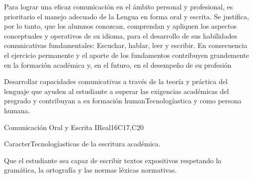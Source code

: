 \begin{syllabus}


\begin{justification}
Para lograr una eficaz comunicación en el ámbito personal y profesional, es prioritario el manejo adecuado de la Lengua en forma oral y escrita. Se justifica, por lo tanto, que los alumnos  conozcan, comprendan y apliquen los aspectos conceptuales y operativos de su idioma, para el desarrollo de sus habilidades comunicativas fundamentales: Escuchar, hablar, leer y escribir.
En consecuencia el ejercicio permanente y el aporte de los fundamentos contribuyen grandemente en la formación académica y, en el futuro, en el desempeño de su profesión
\end{justification}

\begin{goals}
\item Desarrollar capacidades comunicativas a través de la teoría y práctica del lenguaje que ayuden al estudiante a superar las exigencias académicas del pregrado y contribuyan a su formación humanTecnologíastica y como persona humana.
\end{goals}

\begin{outcomes}
   \item {}
   \item {}
   \item {}
\end{outcomes}

\begin{competences}
    \item {}
    \item {}
    \item {}
\end{competences}

\begin{unit}{Comunicación Oral y Escrita I}{}{Real}{16}{C17,C20}
  \begin{topics}
      \item CaracterTecnologíasticas de la escritura académica.
  \end{topics}

  \begin{learningoutcomes}
   \item Que el  estudiante sea capaz de escribir textos expositivos respetando la gramática, la ortografía y las normas léxicas normativas.
  \end{learningoutcomes}
\end{unit}


\end{syllabus}
